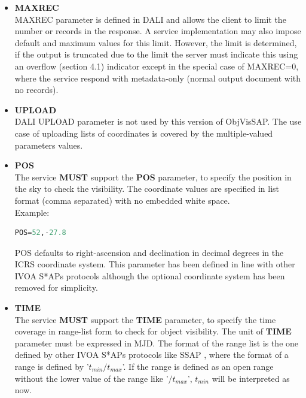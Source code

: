 \documentclass[11pt,a4paper]{ivoatex/ivoa}
\begin{document}
\begin{itemize}
\item{\textbf{MAXREC}\\MAXREC parameter is defined in DALI and allows
the client to limit the number or records in the response. A service
implementation may also impose default and maximum values for this limit.
However, the limit is determined, if the output is truncated due to the
limit the server must indicate this using an overflow (section 4.1)
indicator except in the special case of MAXREC=0, where the service
respond with metadata-only (normal output document with no records).}

\item{\textbf{UPLOAD}\\DALI UPLOAD parameter is not used by this version
of ObjVisSAP. The use case of uploading lists of coordinates is covered
by the multiple-valued parameters values.}

\item{\textbf{POS}\\The service \textbf{MUST }support the
\textbf{POS} parameter, to specify the position in the sky to check the visibility. 
The coordinate values are specified in list format (comma separated) with no embedded white
space.\\
Example:\\
\begin{lstlisting}[language=SQL]
POS=52,-27.8
\end{lstlisting}
\par
POS defaults to right-ascension and declination in decimal degrees in
the ICRS coordinate system. This parameter has been defined in line with
other IVOA S*APs protocols although the optional coordinate system has
been removed for simplicity.}

\item{\textbf{TIME}\\The service \textbf{MUST} support the
\textbf{TIME} parameter, to specify the time coverage in range-list form
to check for object visibility. The unit of \textbf{TIME} parameter must be
expressed in MJD. The format of the range list is the one defined by other
IVOA S*APs protocols like SSAP \citep{std:SSAP}, where the format of a
range is defined by '$t_{min}\slash t_{max}$'. If the range is defined
as an open range without the lower value of the range like '$\slash t_{max}$',
$t_{min}$ will be interpreted as now.\\

}
\end{itemize}
\end{document}
